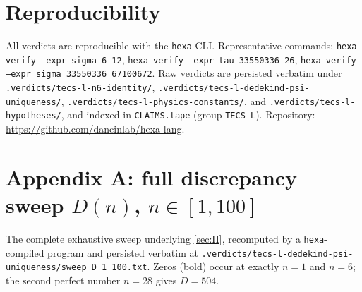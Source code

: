 \documentclass[11pt,a4paper]{article}
\theoremstyle{definition}
\begin{document}
\section*{Reproducibility}

All verdicts are reproducible with the \texttt{hexa} CLI. Representative
commands: \texttt{hexa verify --expr sigma 6 12},
\texttt{hexa verify --expr tau 33550336 26},
\texttt{hexa verify --expr sigma 33550336 67100672}. Raw verdicts are
persisted verbatim under
\texttt{.verdicts/tecs-l-n6-identity/},
\texttt{.verdicts/tecs-l-dedekind-psi-uniqueness/},
\texttt{.verdicts/tecs-l-physics-constants/}, and
\texttt{.verdicts/tecs-l-hypotheses/}, and indexed in \texttt{CLAIMS.tape}
(group \texttt{TECS-L}). Repository:
\url{https://github.com/dancinlab/hexa-lang}.


\appendix
\section{Appendix A: full discrepancy sweep $D(n)$, $n\in[1,100]$}
\label{app:sweep}
The complete exhaustive sweep underlying \textsection\ref{sec:II}, recomputed by a \texttt{hexa}-compiled program and persisted verbatim at \texttt{.verdicts/tecs-l-dedekind-psi-uniqueness/sweep\_D\_1\_100.txt}. Zeros (bold) occur at exactly $n=1$ and $n=6$; the second perfect number $n=28$ gives $D=504$.
\end{document}
